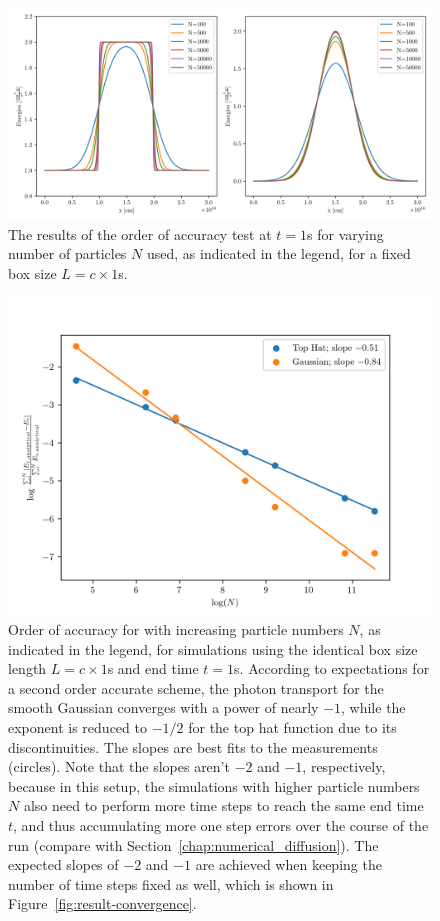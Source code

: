 \begin{figure}
    \centering
    \includegraphics[width=\textwidth]{figures/RHD/accuracy/results-fixed-boxsize.png}%
    \caption{
The results of the order of accuracy test at $t = 1$s for varying number of particles $N$ used, as
indicated in the legend, for a fixed box size $L = c \times 1$s.
    }
    \label{fig:convergence-energy-fixed-boxsize}
\end{figure}


\begin{figure}
    \centering
    \includegraphics[width=.75\textwidth]{figures/RHD/accuracy/convergence-fixed-boxsize.png}%
    \caption{
Order of accuracy for \GEARRT with increasing particle numbers $N$, as indicated in the legend,
for simulations using the identical box size length $L = c \times 1$s and end time $t = 1$s.
According to expectations for a second order accurate scheme, the photon transport for the smooth
Gaussian converges with a power of nearly $-1$, while the exponent is reduced to $-1/2$ for the top
hat function due to its discontinuities. The slopes are best fits to the measurements (circles).
Note that the slopes aren't $-2$ and $-1$, respectively, because in this setup, the simulations
with
higher particle numbers $N$ also need to perform more time steps to reach the same end time $t$,
and thus accumulating more one step errors over the course of the run (compare with
Section~\ref{chap:numerical_diffusion}). The expected slopes of $-2$ and $-1$ are achieved when
keeping the number of time steps fixed as well, which is shown in
Figure~\ref{fig:result-convergence}.
    }
    \label{fig:result-convergence-fixed-boxsize}
\end{figure}



